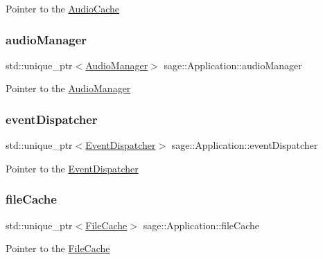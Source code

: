 Pointer to the \mbox{\hyperlink{classsage_1_1AudioCache}{Audio\+Cache}} \mbox{\label{classsage_1_1Application_ac581d8db2c28c51373d3eae40e816620}} 
\subsubsection{\texorpdfstring{audioManager}{audioManager}}
{\footnotesize\ttfamily std\+::unique\+\_\+ptr$<$\mbox{\hyperlink{classsage_1_1AudioManager}{Audio\+Manager}}$>$ sage\+::\+Application\+::audio\+Manager\hspace{0.3cm}{\ttfamily [private]}}

Pointer to the \mbox{\hyperlink{classsage_1_1AudioManager}{Audio\+Manager}} \mbox{\label{classsage_1_1Application_ae7cbe4333c8c285fb78fa6d561090281}} 
\subsubsection{\texorpdfstring{eventDispatcher}{eventDispatcher}}
{\footnotesize\ttfamily std\+::unique\+\_\+ptr$<$\mbox{\hyperlink{classsage_1_1EventDispatcher}{Event\+Dispatcher}}$>$ sage\+::\+Application\+::event\+Dispatcher\hspace{0.3cm}{\ttfamily [private]}}

Pointer to the \mbox{\hyperlink{classsage_1_1EventDispatcher}{Event\+Dispatcher}} \mbox{\label{classsage_1_1Application_adaaeb004710d17aaff977ba58acaa9a5}} 
\subsubsection{\texorpdfstring{fileCache}{fileCache}}
{\footnotesize\ttfamily std\+::unique\+\_\+ptr$<$\mbox{\hyperlink{classsage_1_1FileCache}{File\+Cache}}$>$ sage\+::\+Application\+::file\+Cache\hspace{0.3cm}{\ttfamily [private]}}

Pointer to the \mbox{\hyperlink{classsage_1_1FileCache}{File\+Cache}} \mbox{\label{classsage_1_1Application_a5b1d694037e52b302d32e99ff532277d}} 
